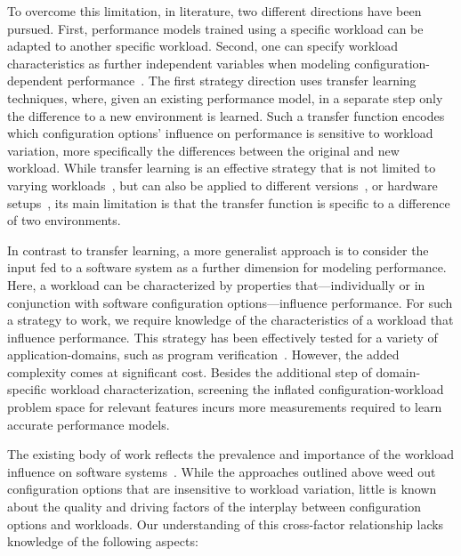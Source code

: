 To overcome this limitation, in literature, two different directions have been pursued. First, performance models trained using a specific workload can be adapted to another specific workload. Second,  one can specify workload characteristics as further independent variables when modeling configuration-dependent performance~\cite{koc_satune_2021}.
The first strategy direction uses transfer learning techniques, where, given an existing performance model, in a separate step only the difference to a new environment is learned. Such a transfer function encodes which configuration options’ influence on performance is sensitive to workload variation, more specifically the differences between the original and new workload. While transfer learning is an effective strategy that is not limited to varying workloads~\cite{jamshidi_learning_2018}, but can also be applied to different versions~\cite{jamishidi_transfer_2017,jamshidi_transfer_gp_2017,martin_transfer_2021}, or hardware setups~\cite{ding_bayesian_2020}, its main limitation is that the transfer function is specific to a difference of two environments.

In contrast to transfer learning, a more generalist approach is to consider the input fed to a software system as a further dimension for modeling performance. Here, a workload can be characterized by properties that---individually or in conjunction with software configuration options---influence performance. For such a strategy to work, we require knowledge of the characteristics of a workload that influence performance. This strategy has been effectively tested for a  variety of application-domains, such as program verification~\cite{koc_satune_2021}. However, the added complexity comes at significant cost. Besides the additional step of domain-specific workload characterization, screening the inflated configuration-workload problem space for relevant features incurs more measurements required to learn accurate performance models.  

The existing body of work reflects the prevalence and importance of the workload influence on software systems~\cite{khavari_compression_2019,maxiaguine_workload_2004,plotnikov_compilation_2013,ding_compilation_2015,falkner_sat_solvers_2015,satzilla_2008,alves_sampling_2020}. While the approaches outlined above weed out configuration options that are insensitive to workload variation, little is known about the quality and driving factors of the interplay between configuration options and workloads. Our understanding of this cross-factor relationship lacks knowledge of the following aspects:

